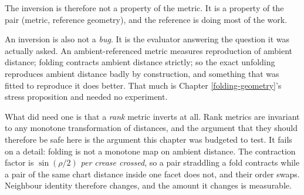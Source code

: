 \documentclass[
  british,
  a4paper,
]{book}
\begin{document}
The inversion is therefore not a property of the metric. It is a property of the
pair (metric, reference geometry), and the reference is doing most of the work.

An inversion is also not a \emph{bug}. It is the evaluator answering the question it
was actually asked. An ambient-referenced metric measures reproduction of
ambient distance; folding contracts ambient distance strictly; so the exact
unfolding reproduces ambient distance badly by construction, and something that
was fitted to reproduce it does better. That much is Chapter
\ref{folding-geometry}'s stress proposition and needed no experiment.

What did need one is that a \emph{rank} metric inverts at all. Rank metrics are
invariant to any monotone transformation of distances, and the argument that
they should therefore be safe here is the argument this chapter was budgeted to
test. It fails on a detail: folding is not a monotone map on ambient distance.
The contraction factor is \(\sin(\rho/2)\) \emph{per crease crossed}, so a pair
straddling a fold contracts while a pair of the same chart distance inside one
facet does not, and their order swaps. Neighbour identity therefore changes,
and the amount it changes is measurable.
\end{document}
